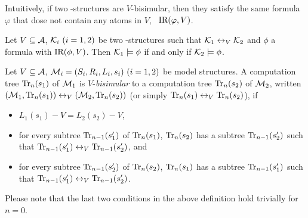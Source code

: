 \documentclass{article}
\begin{document}
Intuitively, if two \MPK-structures are $V$-bisimular, then they satisfy the same formula $\varphi$ that dose not contain any atoms in $V$, \ie\ $\textrm{IR}(\varphi, V)$.
\begin{theorem}\label{thm:V-bisimulation:EQ}
  Let $V\subseteq\cal A$, ${\cal K}_i~(i=1,2)$ be two \MPK-structures such that
  ${\cal K}_1\leftrightarrow_V{\cal K}_2$ and $\phi$ a formula with $\textrm{IR}(\phi,V)$. Then
  ${\cal K}_1\models\phi$ if and only if ${\cal K}_2\models\phi$.
\end{theorem}
%

Let $V\subseteq\cal A$, ${\cal M}_i=(S_i,R_i,L_i,s_i)~(i=1,2)$ be  model structures.
A computation tree $\textrm{Tr}_n(s_1)$ of ${\cal M}_1$ is $V$-{\em bisimular}
to a computation tree $\textrm{Tr}_n(s_2)$ of ${\cal M}_2$, written
$({\cal M}_1,\textrm{Tr}_n(s_1))\leftrightarrow_V({\cal M}_2,\textrm{Tr}_n(s_2))$ (or simply
$\textrm{Tr}_n(s_1)\leftrightarrow_V\textrm{Tr}_n(s_2)$), if %
\begin{itemize}
  \item $L_1(s_1)-V=L_2(s_2)-V$,
  \item for every subtree $\textrm{Tr}_{n-1}(s_1')$ of $\textrm{Tr}_n(s_1)$,
  $\textrm{Tr}_n(s_2)$ has a subtree $\textrm{Tr}_{n-1}(s_2')$ such that
  $\textrm{Tr}_{n-1}(s_1')\leftrightarrow_V\textrm{Tr}_{n-1}(s_2')$, and
  \item for every subtree $\textrm{Tr}_{n-1}(s_2')$ of $\textrm{Tr}_n(s_2)$,
  $\textrm{Tr}_n(s_1)$ has a subtree $\textrm{Tr}_{n-1}(s_1')$ such that
  $\textrm{Tr}_{n-1}(s_1')\leftrightarrow_V\textrm{Tr}_{n-1}(s_2')$.
\end{itemize}
Please note that the last two conditions in the above definition
hold trivially for $n=0$.
\end{document}
